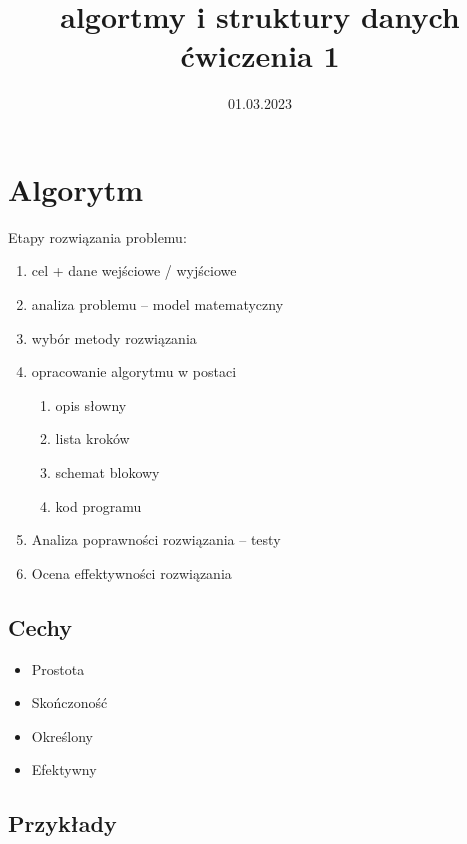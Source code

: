 \documentclass[11pt]{article}
\date{01.03.2023}
\title{algortmy i struktury danych ćwiczenia 1}
\begin{document}
\maketitle
\section{Algorytm}
\label{sec:org09d73af}
Etapy rozwiązania problemu:
\begin{enumerate}
\item cel + dane wejściowe / wyjściowe
\item analiza problemu -- model matematyczny
\item wybór metody rozwiązania
\item opracowanie algorytmu w postaci
\begin{enumerate}
\item opis słowny
\item lista kroków
\item schemat blokowy
\item kod programu
\end{enumerate}
\item Analiza poprawności rozwiązania -- testy
\item Ocena effektywności rozwiązania
\end{enumerate}
\subsection{Cechy}
\label{sec:org96a6f27}
\begin{itemize}
\item Prostota
\item Skończoność
\item Określony
\item Efektywny
\end{itemize}
\subsection{Przykłady}
\label{sec:org33de3d8}
\end{document}
